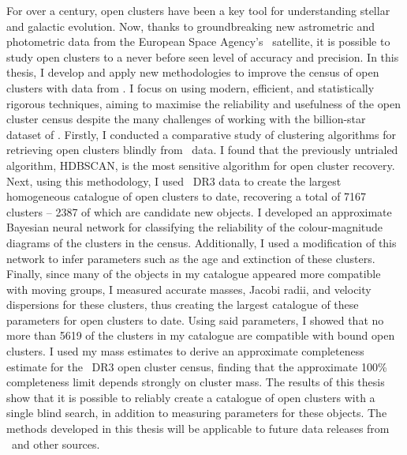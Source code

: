 %

\label{sec:abstract}


For over a century, open clusters have been a key tool for understanding stellar and galactic evolution. 
Now, thanks to groundbreaking new astrometric and photometric data from the European Space Agency's \gaia\ satellite, it is possible to study open clusters to a never before seen level of accuracy and precision. 
In this thesis, I develop and apply new methodologies to improve the census of open clusters with data from \gaia. 
I focus on using modern, efficient, and statistically rigorous techniques, aiming to maximise the reliability and usefulness of the open cluster census despite the many challenges of working with the billion-star dataset of \gaia.
Firstly, I conducted a comparative study of clustering algorithms for retrieving open clusters blindly from \gaia\ data.
I found that the previously untrialed algorithm, HDBSCAN, is the most sensitive algorithm for open cluster recovery.
Next, using this methodology, I used \gaia\ DR3 data to create the largest homogeneous catalogue of open clusters to date, recovering a total of 7167 clusters -- 2387 of which are candidate new objects. 
I developed an approximate Bayesian neural network for classifying the reliability of the colour-magnitude diagrams of the clusters in the census. 
Additionally, I used a modification of this network to infer parameters such as the age and extinction of these clusters. 
Finally, since many of the objects in my catalogue appeared more compatible with moving groups, I measured accurate masses, Jacobi radii, and velocity dispersions for these clusters, thus creating the largest catalogue of these parameters for open clusters to date. 
Using said parameters, I showed that no more than 5619 of the clusters in my catalogue are compatible with bound open clusters. 
I used my mass estimates to derive an approximate completeness estimate for the \gaia\ DR3 open cluster census, finding that the approximate 100\% completeness limit depends strongly on cluster mass. 
The results of this thesis show that it is possible to reliably create a catalogue of open clusters with a single blind search, in addition to measuring parameters for these objects. 
The methods developed in this thesis will be applicable to future data releases from \gaia\ and other sources.


\newpage

